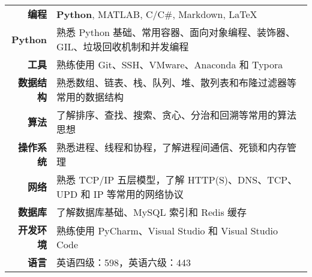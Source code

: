 %

\begin{table}[!htbp]
    \begin{tabular}{rl}
        \icon{\faCode} \textbf{编程} & \textbf{Python}, MATLAB, C/C\#, Markdown, \LaTeX \\
        \textbf{Python} & 熟悉 Python 基础、常用容器、面向对象编程、装饰器、GIL、垃圾回收机制和并发编程 \\
        \icon{\faTools} \textbf{工具} & 熟练使用 Git、SSH、VMware、Anaconda 和 Typora \\
        \textbf{数据结构} & 熟悉数组、链表、栈、队列、堆、散列表和布隆过滤器等常用的数据结构 \\
        \icon{\faPaperPlane} \textbf{算法} & 了解排序、查找、搜索、贪心、分治和回溯等常用的算法思想 \\
        \textbf{操作系统} & 熟悉进程、线程和协程，了解进程间通信、死锁和内存管理 \\
        \icon{\faNetworkWired} \textbf{网络} & 熟悉 TCP/IP 五层模型，了解 HTTP(S)、DNS、TCP、UPD 和 IP 等常用的网络协议\\
        \textbf{数据库} & 了解数据库基础、MySQL 索引和 Redis 缓存 \\
        \textbf{开发环境} & 熟练使用 PyCharm、Visual Studio 和 Visual Studio Code \\
        
        \icon{\faLanguage} \textbf{语言} & 英语四级：598，英语六级：443 
    \end{tabular}
\end{table} 